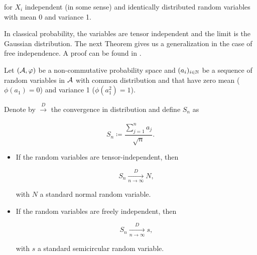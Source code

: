     \noindent for $X_i$ independent (in some sense) and identically distributed random variables with mean 0 and variance 1.

    In classical probability, the variables are tensor independent and the limit is the Gaussian distribution. The next Theorem gives us a generalization in the case of free independence. A proof can be found in \cite{book:nica_speicher}.

    \begin{theorem}
        Let $(\mathcal A,\varphi)$ be a non-commutative probability space and $(a_i)_{i\in \mathbb N}$ be a sequence of random variables in $\mathcal A$ with common distribution and that have zero mean ($\phi(a_1)=0$) and variance 1 ($\phi(a_1^2)=1$). 
        
        Denote by $\xrightarrow[]{D}$ the convergence in distribution and define $S_n$ as

        \[ S_n \coloneqq \frac{\sum_{j=1}^n a_j}{\sqrt{n}}.\]
        \begin{itemize}
            \item If the random variables are tensor-independent, then 
                
            \begin{equation*}
            S_n \xrightarrow[n\to\infty]{D} N,        
            \end{equation*}

            \noindent with $N$ a standard normal random variable.
            
            
            

            

            
            \item If the random variables are freely independent, then 
                
            \begin{equation*}
            S_n \xrightarrow[n\to\infty]{D} s,        
            \end{equation*}

            \noindent with $s$ a standard semicircular random variable.
        \end{itemize}
    \end{theorem}

